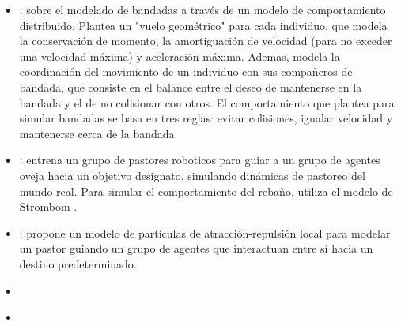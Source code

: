 \documentclass[final]{article}
\begin{document}
\begin{itemize}
    \item \citet{ReynoldsBoids}: sobre el modelado de bandadas a través de un modelo de comportamiento distribuido. Plantea un "vuelo geométrico" para cada
    individuo, que modela la conservación de momento, la amortiguación de velocidad (para no exceder una velocidad máxima) y aceleración máxima. Ademas, modela
    la coordinación del movimiento de un individuo con sus compañeros de bandada, que consiste en el balance entre el deseo de mantenerse en la bandada y el
    de no colisionar con otros. El comportamiento que plantea para simular bandadas se basa en tres reglas: evitar colisiones, igualar velocidad y mantenerse
    cerca de la bandada.
    \item \citet{SankarShepherding}: entrena un grupo de pastores roboticos para guiar a un grupo de agentes oveja hacia un objetivo designato, simulando
    dinámicas de pastoreo del mundo real. Para simular el comportamiento del rebaño, utiliza el modelo de Strombom \citep{Strombom}.
    \item \citet{Strombom}: propone un modelo de partículas de atracción-repulsión local para modelar un pastor guiando un grupo de agentes que interactuan entre
    sí hacia un destino predeterminado.
    \item \citet{NapolitanoShepherding}
    \item \citet{CovoneShepherding}
\end{itemize}



\end{document}
